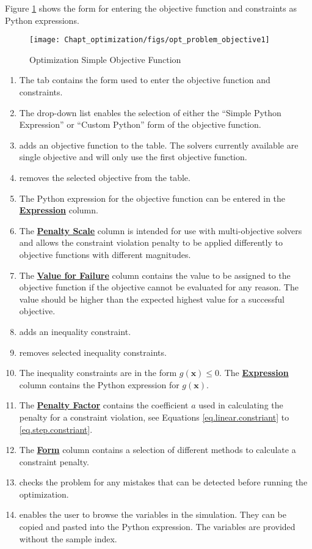 Figure \ref{fig.opt.problem.objective1} shows the form for entering the objective function and constraints as Python expressions.

\begin{figure}[H]
	\begin{center}
		\texttt{[image: Chapt\_optimization/figs/opt\_problem\_objective1]}
		\caption{Optimization Simple Objective Function}
		\label{fig.opt.problem.objective1}
	\end{center}
\end{figure}

\begin{enumerate}
	\item The  tab contains the form used to enter the objective function and constraints.
	\item The drop-down list enables the selection of either the ``Simple Python Expression'' or ``Custom Python'' form of the objective function.
	\item \bu{+} adds an objective function to the table. The solvers currently available are single objective and will only use the first objective function.
	\item \bu{-} removes the selected objective from the table.
	\item The Python expression for the objective function can be entered in the \textbf{\underline{Expression}} column.
	\item The \textbf{\underline{Penalty Scale}} column is intended for use with multi-objective solvers and allows the constraint violation penalty to be applied differently to objective functions with different magnitudes.
	\item The \textbf{\underline{Value for Failure}} column contains the value to be assigned to the objective function if the objective cannot be evaluated for any reason. The value should be higher than the expected highest value for a successful objective.
	\item \bu{+} adds an inequality constraint.
	\item \bu{-} removes selected inequality constraints.
	\item The inequality constraints are in the form $g(\mathbf{x}) \leq 0$. The \textbf{\underline{Expression}} column contains the Python expression for $g(\mathbf{x})$.
	\item The \textbf{\underline{Penalty Factor}} contains the coefficient $a$ used in calculating the penalty for a constraint violation, see Equations \ref{eq.linear.constriant} to \ref{eq.step.constriant}.
	\item The \textbf{\underline{Form}} column contains a selection of different methods to calculate a constraint penalty.
	\item {} checks the problem for any mistakes that can be detected before running the optimization.
	\item {} enables the user to browse the variables in the simulation. They can be copied and pasted into the Python expression. The variables are provided without the sample index.
\end{enumerate}

